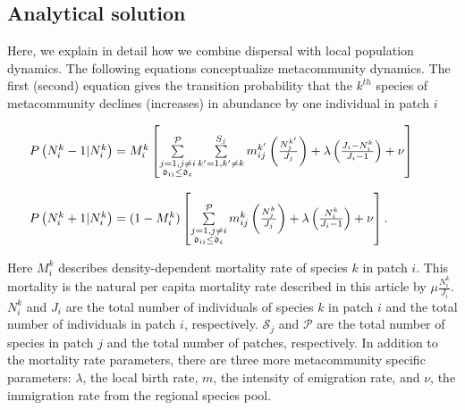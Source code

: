 \documentclass[a4paper,12pt]{article}
\begin{document}
\subsection*{Analytical solution} 
\label{text:analytical}
Here, we explain in detail how we combine dispersal with local
population dynamics. The following equations conceptualize
metacommunity dynamics. The first (second) equation gives the
transition probability that the $k^{th}$ species of
metacommunity declines (increases) in abundance by one individual in
patch $i$

\begin{equation}
\begin{array}{lcr}
\hspace{-0.25 in}P \left(N_{i}^{k} - 1 | N_{i}^{k} \right) = M^{k}_{i} \left[\sum\limits^{\mathcal{P}}_{\substack{j = 1,j \ne i \\ \mathfrak{d_{ij}} \leq \mathfrak{d_{c}}}}
 \sum\limits_{k'=1,k'\ne k}^{S_{j}} m_{ij}^{k'} \left(\frac{N_{j}^{k'}}{J_{j}}\right) + \lambda \left(\frac{J_{i} - N_{i}^{k}}{J_{i} - 1}\right) + \nu \right]\\[0.5cm]
\\
\hspace{-0.25 in}P \left(N_{i}^{k} + 1 | N_{i}^{k}\right) = (1 - M^{k}_{i}) \left[
\sum\limits^{\mathcal{P}}_{\substack{j = 1,j \ne i \\ \mathfrak{d_{ij}} \leq \mathfrak{d_{c}}}}
 m_{ij}^{k} \left(\frac{N_{j}^{k}}{J_{j}}\right) + \lambda \left(\frac{N_{i}^{k}}{J_{i} - 1}\right) + \nu \right].
\end{array}
\label{master}
\end{equation}

Here $M^{k}_{i}$ describes density-dependent mortality rate of species
$k$ in patch $i$. This mortality is the natural per capita mortality
rate described in this article by $\mu
\frac{N_{i}^{k}}{J_{i}}$. $N_{i}^{k}$ and $J_{i}$ are the total number of
individuals of species $k$ in patch $i$ and the total number of individuals
in patch $i$, respectively. $\mathcal{S}_{j}$ and $\mathcal{P}$ are
the total number of species in patch $j$ and the total number of
patches, respectively. In addition to the mortality rate parameters,
there are three more metacommunity specific parameters: $\lambda$, the
local birth rate, $m$, the intensity of emigration rate, and $\nu$,
the immigration rate from the regional species pool.
\end{document}
